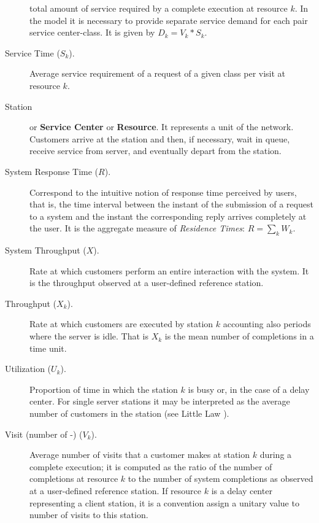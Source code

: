 \begin{description}
total amount of service required  by a complete execution at
resource $k$. In the model it is necessary to provide separate
service demand for each pair service center-class. It is given by
$D_k = V_k * S_k$. \item[Service Time ($S_k$).] Average service
requirement of a request of a given class per visit at resource
$k$. \item[Station] or \textbf{Service Center} or
\textbf{Resource}. It represents a unit of the network. Customers
arrive at the station and then, if necessary, wait in queue,
receive service from server, and eventually depart from the
station. \item[System Response Time ($R$).] Correspond to the
intuitive notion of response time perceived by users, that is, the
time interval between the instant of the submission of a request
to a system and the instant the corresponding reply arrives
completely at the user. It is the aggregate measure of
\emph{Residence Times}: $R= \sum_k W_k$. \item[System Throughput
($X$).] Rate at which customers perform an entire interaction with
the system. It is the throughput observed at a user-defined
reference station. \item[Throughput ($X_k$).] Rate at which
customers are executed by station $k$ accounting also periods
where the server is idle. That is $X_k$ is the mean number of
completions in a time unit.
\item[Utilization ($U_k$).] Proportion of time in which the station $k$ is busy or, in the case of a delay center. For single server stations it may be interpreted as the average  number of  customers in the station (see Little Law \cite{Little}).
\item[Visit (number of -) ($V_k$).] Average number of visits that a customer makes at station $k$ during a complete execution; it is computed as the ratio of the number of completions at resource $k$ to the number of system completions as observed at a user-defined reference station. If resource $k$ is a delay center representing a client station, it is a convention assign a unitary value to number of visits to this station.
\end{description}
%
